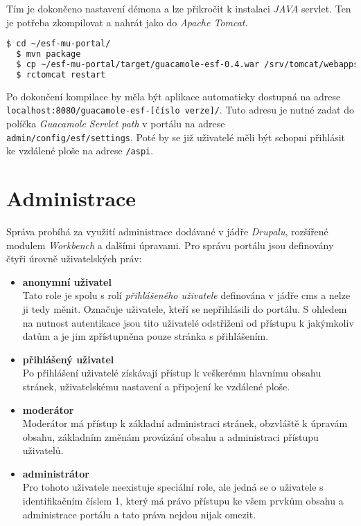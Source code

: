 Tím je dokončeno nastavení démona a lze přikročit k instalaci \emph{JAVA} \gls{servlet}. Ten je potřeba zkompilovat a nahrát jako do \emph{Apache Tomcat}.

\begin{lstlisting}[language=bash]
  $ cd ~/esf-mu-portal/
  $ mvn package
  $ cp ~/esf-mu-portal/target/guacamole-esf-0.4.war /srv/tomcat/webapps/
  $ rctomcat restart

\end{lstlisting}

Po dokončení kompilace by měla být aplikace automaticky dostupná na adrese \texttt{localhost:8080/guacamole-esf-[číslo verze]/}. Tuto adresu je nutné zadat do políčka \emph{Guacamole Servlet path} v portálu na adrese \\ \texttt{admin/config/esf/settings}. Poté by se již uživatelé měli být schopni přihlásit ke vzdálené ploše na adrese \texttt{/aspi}.

\section{Administrace}
\label{sec:administrace}
Správa probíhá za využití administrace dodávané v jádře \emph{Drupalu}, rozšířené modulem \emph{Workbench} a dalšími úpravami. Pro správu portálu jsou definovány čtyři úrovně uživatelských práv:

\begin{itemize}
  \item \textbf{anonymní uživatel} \hfill \\
    Tato role je spolu s rolí \emph{přihlášeného uživatele} definována v jádře \gls{cms} a nelze ji tedy měnit. Označuje uživatele, kteří se nepřihlásili do portálu. S ohledem na nutnost autentikace jsou tito uživatelé odstřiženi od přístupu k jakýmkoliv datům a je jim zpřístupněna pouze stránka s přihlášením.
  \item \textbf{přihlášený uživatel} \hfill \\
    Po přihlášení uživatelé získávají přístup k veškerému hlavnímu obsahu stránek, uživatelskému nastavení a připojení ke vzdálené ploše. 
  \item \textbf{moderátor} \hfill \\
    Moderátor má přístup k základní administraci stránek, obzvláště k úpravám obsahu, základním změnám provázání obsahu a administraci přístupu uživatelů.
  \item \textbf{administrátor} \hfill \\
    Pro tohoto uživatele neexistuje speciální role, ale jedná se o uživatele s identifikačním číslem 1, který má právo přístupu ke všem prvkům obsahu a administrace portálu a tato práva nejdou nijak omezit.
\end{itemize}

